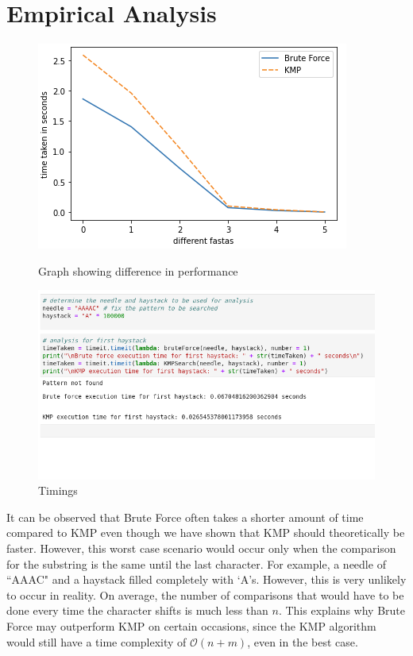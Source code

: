 \section*{Empirical Analysis}

\begin{figure}[H]
  \centering
  \begin{minipage}[b]{0.49\textwidth}
    \includegraphics[width=\textwidth]{images/graph-with-axes.png}
    \caption{Graph showing difference in performance}
    \label{fig:graph}
  \end{minipage}
  \hfill
  \begin{minipage}[b]{0.49\textwidth}
    \includegraphics[width=\textwidth]{images/worst_case.png}
    \caption{Timings}
    \label{fig:timings}
  \end{minipage}
\end{figure}

It can be observed that Brute Force often takes a shorter amount of time compared to KMP even though we have shown that KMP should theoretically be faster. However, this worst case scenario would occur only when the comparison for the substring is the same until the last character. For example, a needle of ``AAAC" and a haystack filled completely with `A's. However, this is very unlikely to occur in reality. On average, the number of comparisons that would have to be done every time the character shifts is much less than $n$. This explains why Brute Force may outperform KMP on certain occasions, since the KMP algorithm would still have a time complexity of $\mathcal{O}(n+m)$, even in the best case.